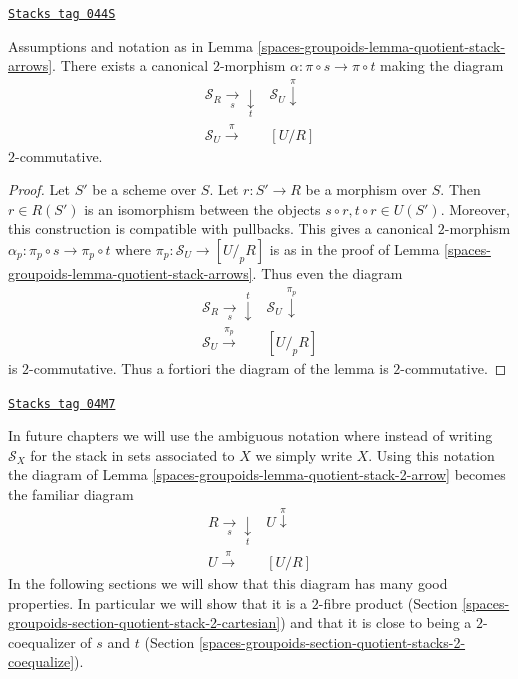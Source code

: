 \begin{lemma}
\label{spaces-groupoids-lemma-quotient-stack-2-arrow}
\href{https://stacks.math.columbia.edu/tag/044S}{\texttt{Stacks tag 044S}}

Assumptions and notation as in Lemma \ref{spaces-groupoids-lemma-quotient-stack-arrows}.
There exists a canonical $2$-morphism
$\alpha : \pi \circ s \to \pi \circ t$ making the diagram
$$
\begin{array}{cc}\mathcal{S}_R \underset{s}{\longrightarrow}\underset{t}{\downarrow} & \mathcal{S}_U \overset{\pi}{\downarrow} \\ \mathcal{S}_U \overset{\pi}{\longrightarrow} & [U/R]\end{array}
$$
$2$-commutative.
\end{lemma}

\begin{proof}
Let $S'$ be a scheme over $S$. Let $r : S' \to R$ be a morphism over $S$.
Then $r \in R(S')$ is an isomorphism between the objects
$s \circ r, t \circ r \in U(S')$. Moreover, this construction is
compatible with pullbacks. This gives a canonical
$2$-morphism $\alpha_p : \pi_p \circ s \to \pi_p \circ t$
where $\pi_p : \mathcal{S}_U \to [U/_{\!p}R]$ is as in the
proof of
Lemma \ref{spaces-groupoids-lemma-quotient-stack-arrows}. Thus even the diagram
$$
\begin{array}{cc}\mathcal{S}_R \underset{s}{\longrightarrow}\overset{t}{\downarrow} & \mathcal{S}_U \overset{\pi_p}{\downarrow} \\ \mathcal{S}_U \overset{\pi_p}{\longrightarrow} & [U/_{\!p}R]\end{array}
$$
is $2$-commutative. Thus a fortiori the diagram
of the lemma is $2$-commutative.
\end{proof}

\begin{remark}
\label{spaces-groupoids-remark-fundamental-square}
\href{https://stacks.math.columbia.edu/tag/04M7}{\texttt{Stacks tag 04M7}}

In future chapters we will use the ambiguous notation where
instead of writing $\mathcal{S}_X$ for the stack in sets associated
to $X$ we simply write $X$. Using this notation the diagram of
Lemma \ref{spaces-groupoids-lemma-quotient-stack-2-arrow}
becomes the familiar diagram
$$
\begin{array}{cc}R \underset{s}{\longrightarrow}\underset{t}{\downarrow} & U \overset{\pi}{\downarrow} \\ U \overset{\pi}{\longrightarrow} & [U/R]\end{array}
$$
In the following sections we will show that this diagram has
many good properties. In particular we will show that it is
a $2$-fibre product
(Section \ref{spaces-groupoids-section-quotient-stack-2-cartesian})
and that it is close to being a $2$-coequalizer of $s$ and $t$
(Section \ref{spaces-groupoids-section-quotient-stacks-2-coequalize}).
\end{remark}

